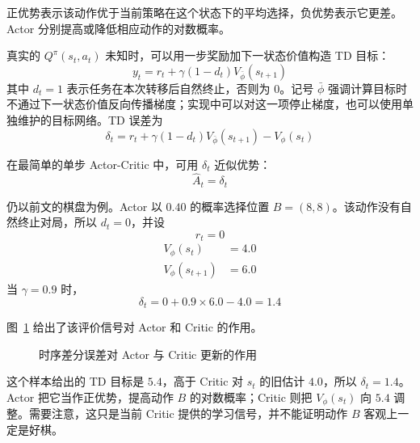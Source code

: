 \documentclass[UTF8,a4paper,zihao=-4,oneside,openany]{ctexbook}
\begin{document}
正优势表示该动作优于当前策略在这个状态下的平均选择，负优势表示它更差。Actor 分别提高或降低相应动作的对数概率。

真实的 $Q^\pi(s_t,a_t)$ 未知时，可以用一步奖励加下一状态价值构造 TD 目标：
\begin{equation}
y_t=r_t+\gamma(1-d_t)V_{\bar\phi}(s_{t+1})
\end{equation}
其中 $d_t=1$ 表示任务在本次转移后自然终止，否则为 0。记号 $\bar\phi$ 强调计算目标时不通过下一状态价值反向传播梯度；实现中可以对这一项停止梯度，也可以使用单独维护的目标网络。TD 误差为
\begin{equation}
\delta_t
=
r_t+\gamma(1-d_t)V_{\bar\phi}(s_{t+1})-V_{\phi}(s_t)
\end{equation}

在最简单的单步 Actor-Critic 中，可用 $\delta_t$ 近似优势：
\begin{equation}
\widehat{A}_t
=
\delta_t
\end{equation}

仍以前文的棋盘为例。Actor 以 $0.40$ 的概率选择位置 $B=(8,8)$。该动作没有自然终止对局，所以 $d_t=0$，并设
\begin{equation}
r_t=0
\end{equation}
\begin{align}
V_{\phi}(s_t)&=4.0\\
V_{\phi}(s_{t+1})&=6.0
\end{align}
当 $\gamma=0.9$ 时，
\begin{equation}
\delta_t
=
0+0.9\times6.0-4.0
=
1.4
\end{equation}

图~\ref{fig:actor_critic_td_update} 给出了该评价信号对 Actor 和 Critic 的作用。

\begin{figure}[htbp]
  \centering
  \caption{时序差分误差对 Actor 与 Critic 更新的作用}
  \label{fig:actor_critic_td_update}
\end{figure}

这个样本给出的 TD 目标是 $5.4$，高于 Critic 对 $s_t$ 的旧估计 $4.0$，所以 $\delta_t=1.4$。Actor 把它当作正优势，提高动作 $B$ 的对数概率；Critic 则把 $V_\phi(s_t)$ 向 $5.4$ 调整。需要注意，这只是当前 Critic 提供的学习信号，并不能证明动作 $B$ 客观上一定是好棋。
\end{document}
